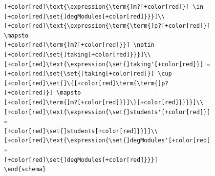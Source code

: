 \begin{figure}[H]
\begin{minipage}{0.45\textwidth}
\begin{tiny}
\begin{BVerbatim}[commandchars=+\[\]]
[+color[red]\text{\expression{\term{]m?[+color[red]}] \in
[+color[red]\set{]degModules[+color[red]}}}]\\
[+color[red]\text{\expression{\term{\term{]p?[+color[red]}] \mapsto
[+color[red]\term{]m?[+color[red]}}] \notin
[+color[red]\set{]taking[+color[red]}}}]\\
[+color[red]\text{\expression{\set{]taking'[+color[red]}] =
[+color[red]\set{\set{]taking[+color[red]}] \cup
[+color[red]\set{]\{[+color[red]\term{\term{]p?[+color[red]}] \mapsto
[+color[red]\term{]m?[+color[red]}}]\}[+color[red]}}}}]\\
[+color[red]\text{\expression{\set{]students'[+color[red]}] =
[+color[red]\set{]students[+color[red]}}}]\\
[+color[red]\text{\expression{\set{]degModules'[+color[red]}] =
[+color[red]\set{]degModules[+color[red]}}}]
\end{schema}


\end{BVerbatim}
\end{tiny}
\end{minipage}
\end{figure}
